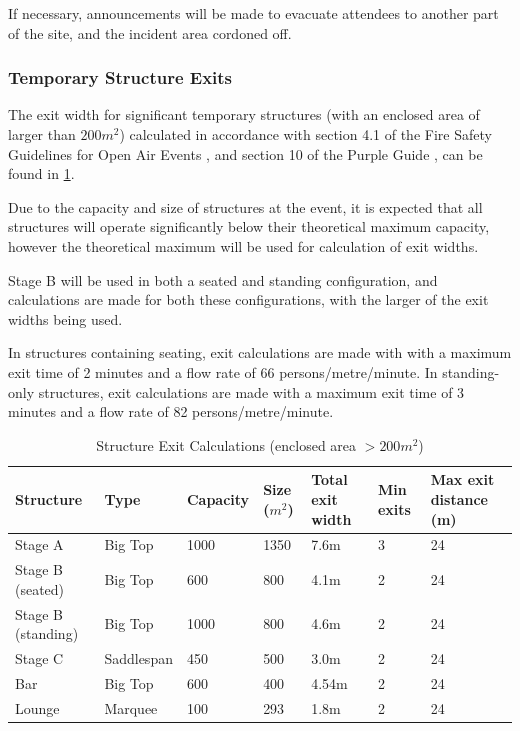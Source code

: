 If necessary, announcements will be made to evacuate attendees to another part of the
site, and the incident area cordoned off.

\subsubsection{Temporary Structure Exits}

The exit width for significant temporary structures (with an enclosed area of larger than
$200m^2$) calculated in accordance with section 4.1 of the Fire Safety Guidelines
for Open Air Events \cite{firesafety}, and section 10 of the Purple Guide \cite{purpleguide},
can be found in \cref{table:exit}.

Due to the capacity and size of structures at the event, it is expected that all structures will operate
significantly below their theoretical maximum capacity, however the theoretical maximum will be
used for calculation of exit widths.

Stage B will be used in both a seated and standing configuration, and calculations are made for
both these configurations, with the larger of the exit widths being used.

In structures containing seating, exit calculations are made with
with a maximum exit time of 2 minutes and a flow rate of 66 persons/metre/minute. In
standing-only structures, exit calculations are made with a maximum exit time of 3 minutes and a
flow rate of 82 persons/metre/minute.

\begin{table}[h!]
    \caption{Structure Exit Calculations (enclosed area $>200m^2$)}
    \label{table:exit}
    \centering
    \begin{tabular}{| l | l | l | l | p{2cm} | l | p{2.1cm} |}
        \hline
        \textbf{Structure}        & \textbf{Type}      & \textbf{Capacity}              & \textbf{Size ($m^2$)} &
        \textbf{Total exit width} & \textbf{Min exits} & \textbf{Max exit distance (m)}                                          \\ \hline
        Stage A                   & Big Top            & 1000                           & 1350                  & 7.6m  & 3 & 24 \\
        Stage B (seated)          & Big Top            & 600                            & 800                   & 4.1m  & 2 & 24 \\
        Stage B (standing)        & Big Top            & 1000                           & 800                   & 4.6m  & 2 & 24 \\
        Stage C                   & Saddlespan         & 450                            & 500                   & 3.0m  & 2 & 24 \\
        Bar                       & Big Top            & 600                            & 400                   & 4.54m & 2 & 24 \\
        Lounge                    & Marquee            & 100                            & 293                   & 1.8m  & 2 & 24 \\
        \hline
    \end{tabular}
\end{table}

